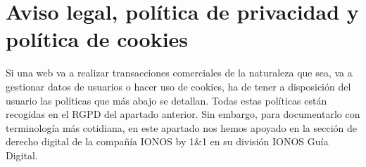 \documentclass[
  a4paper,
  openany]{book}
\begin{document}
\hypertarget{aviso-legal-poluxedtica-de-privacidad-y-poluxedtica-de-cookies}{%
\section{Aviso legal, política de privacidad y política de cookies}\label{aviso-legal-poluxedtica-de-privacidad-y-poluxedtica-de-cookies}}

Si una web va a realizar transacciones comerciales de la naturaleza que sea, va a gestionar datos de usuarios o hacer uso de cookies, ha de tener a disposición del usuario las políticas que más abajo se detallan. Todas estas políticas están recogidas en el RGPD del apartado anterior. Sin embargo, para documentarlo con terminología más cotidiana, en este apartado nos hemos apoyado en la sección de derecho digital de la compañía IONOS by 1\&1 en su división IONOS Guía Digital.
\end{document}
